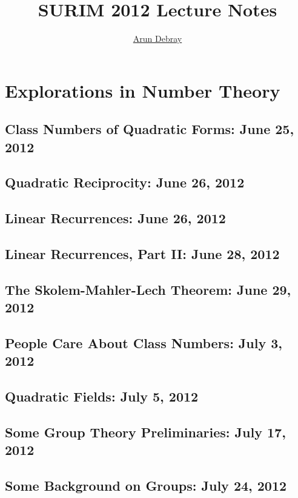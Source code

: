 \documentclass[twosided,openany]{book}
\begin{document}
\title{SURIM 2012 Lecture Notes}
\author{\href{mailto:adebray@stanford.edu}{Arun Debray}}
\maketitle
\tableofcontents
\chapter{Explorations in Number Theory}
    \section{Class Numbers of Quadratic Forms: June 25, 2012}
	
    \section{Quadratic Reciprocity: June 26, 2012}
	
    \section{Linear Recurrences: June 26, 2012}
	
    \section{Linear Recurrences, Part II: June 28, 2012}
	
    \section{The Skolem-Mahler-Lech Theorem: June 29, 2012}
	
    \section{People Care About Class Numbers: July 3, 2012}
    	
    \section{Quadratic Fields: July 5, 2012}
	
    \section{Some Group Theory Preliminaries: July 17, 2012}
	
    \section{Some Background on Groups: July 24, 2012}
	
\end{document}
